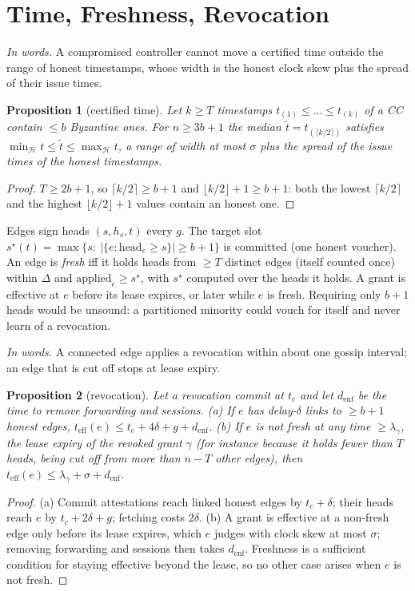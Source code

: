 \documentclass[conference]{IEEEtran}
\newtheorem{proposition}{Proposition}
\newcommand{\Hn}{\mathcal{H}}
\newcommand{\words}[1]{\par\noindent\textit{In words.} #1\par\smallskip}
\begin{document}
\section{Time, Freshness, Revocation}
\words{A compromised controller cannot move a certified time outside the range of honest timestamps, whose width is the honest clock skew plus the spread of their issue times.}
\begin{proposition}[certified time]\label{prop:time}
Let $k\ge T$ timestamps $t_{(1)}\le\dots\le t_{(k)}$ of a CC contain $\le b$ Byzantine ones. For $n\ge3b+1$ the median $\tilde t=t_{(\lceil k/2\rceil)}$ satisfies $\min_{\Hn}t\le\tilde t\le\max_{\Hn}t$, a range of width at most $\sigma$ plus the spread of the issue times of the honest timestamps.
\end{proposition}
\begin{proof}
$T\ge2b+1$, so $\lceil k/2\rceil\ge b+1$ and $\lfloor k/2\rfloor+1\ge b+1$: both the lowest $\lceil k/2\rceil$ and the highest $\lfloor k/2\rfloor+1$ values contain an honest one.
\end{proof}
Edges sign heads $(s,h_s,t)$ every $g$. The target slot $s^\star(t)=\max\{s:\ |\{e:\mathrm{head}_e\ge s\}|\ge b+1\}$ is committed (one honest voucher). An edge is \emph{fresh} iff it holds heads from $\ge T$ distinct edges (itself counted once) within $\Delta$ and $\mathrm{applied}_e\ge s^\star$, with $s^\star$ computed over the heads it holds. A grant is effective at $e$ before its lease expires, or later while $e$ is fresh. Requiring only $b{+}1$ heads would be unsound: a partitioned minority could vouch for itself and never learn of a revocation.
\words{A connected edge applies a revocation within about one gossip interval; an edge that is cut off stops at lease expiry.}
\begin{proposition}[revocation]\label{prop:revoke}
Let a revocation commit at $t_c$ and let $d_{\mathrm{enf}}$ be the time to remove forwarding and sessions. (a) If $e$ has delay-$\delta$ links to $\ge b+1$ honest edges, $t_{\mathrm{eff}}(e)\le t_c+4\delta+g+d_{\mathrm{enf}}$. (b) If $e$ is not fresh at any time $\ge\lambda_\gamma$, the lease expiry of the revoked grant $\gamma$ (for instance because it holds fewer than $T$ heads, being cut off from more than $n{-}T$ other edges), then $t_{\mathrm{eff}}(e)\le\lambda_\gamma+\sigma+d_{\mathrm{enf}}$.
\end{proposition}
\begin{proof}
(a) Commit attestations reach linked honest edges by $t_c{+}\delta$; their heads reach $e$ by $t_c{+}2\delta{+}g$; fetching costs $2\delta$. (b) A grant is effective at a non-fresh edge only before its lease expires, which $e$ judges with clock skew at most $\sigma$; removing forwarding and sessions then takes $d_{\mathrm{enf}}$. Freshness is a sufficient condition for staying effective beyond the lease, so no other case arises when $e$ is not fresh.
\end{proof}
\end{document}

